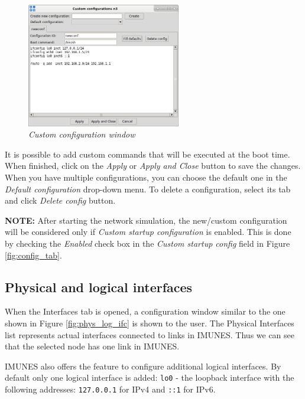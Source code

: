 \begin{figure}[H]
\centering
\vspace{10pt}
\includegraphics[width=0.6\textwidth]{./images/custom_configuration.png}
\caption{\emph{Custom configuration window}}
\label{fig:custom_config}
\end{figure}

It is possible to add custom commands that will be executed at the boot time.
When finished, click on the \emph{Apply} or \emph{Apply and Close} button to
save the changes. When you have multiple configurations, you can choose the
default one in the \emph{Default configuration} drop-down menu. To delete a
configuration, select its tab and click \emph{Delete config} button.

\textbf{NOTE:} After starting the network simulation, the new/custom
configuration will be considered only if \emph{Custom startup configuration} is
enabled. This is done by checking the \emph{Enabled} check box in the
\emph{Custom startup config} field in Figure \ref{fig:config_tab}.

\subsection{Physical and logical interfaces}

When the Interfaces tab is opened, a configuration window similar to the one
shown in Figure \ref{fig:phys_log_ifc} is shown to the user. The Physical
Interfaces list represents actual interfaces connected to links in IMUNES. Thus
we can see that the selected node has one link in IMUNES.

IMUNES also offers the feature to configure additional logical interfaces. By
default only one logical interface is added: \texttt{lo0} - the loopback
interface with the following addresses: \texttt{127.0.0.1} for IPv4 and
\texttt{::1} for IPv6. 

